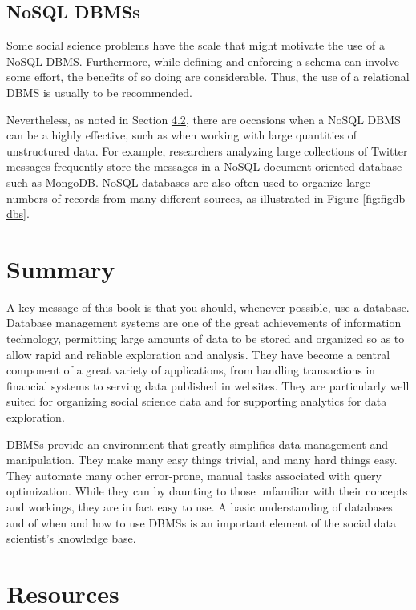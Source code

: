 \documentclass[]{krantz}
\begin{document}
\subsection{NoSQL DBMSs}\label{nosql-dbmss}

Some social science problems have the scale that might motivate the use
of a NoSQL DBMS. Furthermore, while defining and enforcing a schema can
involve some effort, the benefits of so doing are considerable. Thus,
the use of a relational DBMS is usually to be recommended.

Nevertheless, as noted in Section \protect\hyperlink{sec:db:when}{4.2},
there are occasions when a NoSQL DBMS can be a highly effective, such as
when working with large quantities of unstructured data. For example,
researchers analyzing large collections of Twitter messages frequently
store the messages in a NoSQL document-oriented database such as
MongoDB. NoSQL databases are also often used to organize large numbers
of records from many different sources, as illustrated in Figure
\ref{fig:figdb-dbs}.

\section{Summary}\label{summary-1}

A key message of this book is that you should, whenever possible, use a
database. Database management systems are one of the great achievements
of information technology, permitting large amounts of data to be stored
and organized so as to allow rapid and reliable exploration and
analysis. They have become a central component of a great variety of
applications, from handling transactions in financial systems to serving
data published in websites. They are particularly well suited for
organizing social science data and for supporting analytics for data
exploration.

DBMSs provide an environment that greatly simplifies data management and
manipulation. They make many easy things trivial, and many hard things
easy. They automate many other error-prone, manual tasks associated with
query optimization. While they can by daunting to those unfamiliar with
their concepts and workings, they are in fact easy to use. A basic
understanding of databases and of when and how to use DBMSs is an
important element of the social data scientist's knowledge base.

\section{Resources}\label{resources-1}
\end{document}
